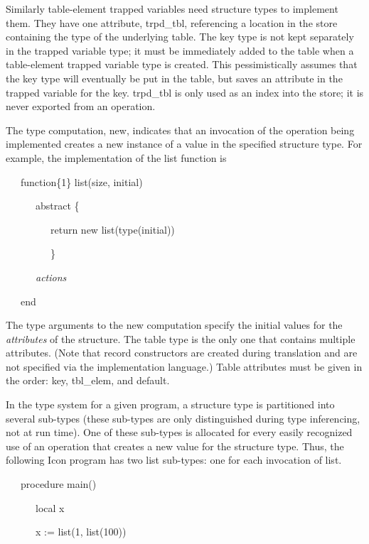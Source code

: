Similarly table-element trapped variables need structure types to
implement them. They have one attribute, trpd\_tbl, referencing a
location in the store containing the type of the underlying table. The
key type is not kept separately in the trapped variable type; it must
be immediately added to the table when a table-element trapped
variable type is created. This pessimistically assumes that the key
type will eventually be put in the table, but saves an attribute in
the trapped variable for the key. trpd\_tbl is only used as an index
into the store; it is never exported from an operation.

The type computation, new, indicates that an invocation of the
operation being implemented creates a new instance of a value in the
specified structure type. For example, the implementation of the list
function is

{\ttfamily\mdseries
\ \ \ function\{1\} list(size, initial)}

{\ttfamily\mdseries
\ \ \ \ \ \ abstract \{}

{\ttfamily\mdseries
\ \ \ \ \ \ \ \ \ return new list(type(initial))}

{\ttfamily\mdseries
\ \ \ \ \ \ \ \ \ \}}

{\ttfamily\mdseries
\ \ \ \ \ \ \textit{actions}}

{\ttfamily\mdseries
\ \ \ end}

The type arguments to the new computation specify the initial values
for the \textit{attributes} of the structure. The table type is the
only one that contains multiple attributes. (Note that record
constructors are created during translation and are not specified via
the implementation language.) Table attributes must be given in the
order: key, tbl\_elem, and default.

In the type system for a given program, a structure type is
partitioned into several sub-types (these sub-types are only
distinguished during type inferencing, not at run time). One of these
sub-types is allocated for every easily recognized use of an operation
that creates a new value for the structure type. Thus, the following
Icon program has two list sub-types: one for each invocation of list.

{\ttfamily\mdseries
\ \ \ procedure main()}

{\ttfamily\mdseries
\ \ \ \ \ \ local x}


\bigskip

{\ttfamily\mdseries
\ \ \ \ \ \ x := list(1, list(100))}

